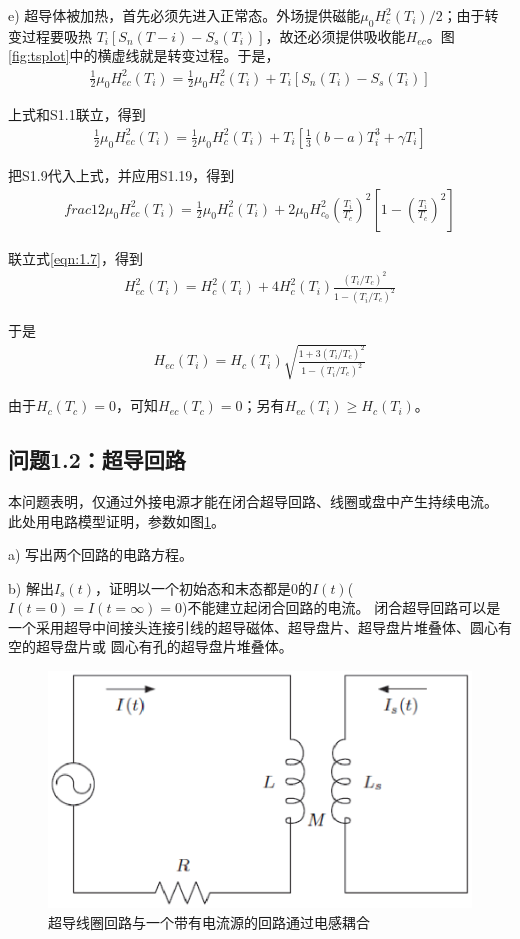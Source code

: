e) 超导体被加热，首先必须先进入正常态。外场提供磁能$\mu_0 H_c^2(T_i)/2$；由于转变过程要吸热
$T_i[S_n(T-i)-S_s(T_i)]$，故还必须提供吸收能$H_{ec}$。图\ref{fig:tsplot}中的横虚线就是转变过程。于是，
\begin{align*}
\frac{1}{2}\mu_0 H_{ec}^2(T_i)=\frac{1}{2}\mu_0 H_c^2(T_i)+T_i[S_n(T_i)-S_s(T_i)]\tag{S1.21}
\end{align*}

上式和S1.1联立，得到
\begin{align*}
\frac{1}{2}\mu_0 H_{ec}^2(T_i)=\frac{1}{2}\mu_0 H_c^2(T_i)+T_i\left[\frac{1}{3}(b-a)T_i^3+\gamma T_i\right] \tag{S1.22}
\end{align*}

把S1.9代入上式，并应用S1.19，得到
\begin{align*}
frac{1}{2}\mu_0 H_{ec}^2(T_i)=\frac{1}{2}\mu_0 H_c^2(T_i)+2\mu_0 H_{c_0}^2\left(\frac{T_i}{T_c}\right)^2 \left[1-\left(\frac{T_i}{T_c}\right)^2 \right] \tag{S1.23}
\end{align*}

联立式\ref{eqn:1.7}，得到
\begin{align*}
H_{ec}^2(T_i)=H_c^2(T_i)+4H_c^2(T_i)\frac{(T_i/T_c)^2}{1-(T_i/T_c)^2} \tag{S1.24}
\end{align*}

于是
\begin{align*}
H_{ec}(T_i)=H_c(T_i)\sqrt{\frac{1+3(T_i/T_c)^2}{1-(T_i/T_c)^2}}
\end{align*}

由于$H_c(T_c)=0$，可知$H_{ec}(T_c)=0$；另有$H_{ec}(T_i)\ge H_c(T_i)$。


\subsection{问题1.2：超导回路}
本问题表明，仅通过外接电源才能在闭合超导回路、线圈或盘中产生持续电流。
此处用电路模型证明，参数如图\ref{scloop}。
 
a) 写出两个回路的电路方程。

b) 解出$I_s(t)$，证明以一个初始态和末态都是0的$I(t)$($I(t=0)=I(t=\infty)=0$)不能建立起闭合回路的电流。
闭合超导回路可以是一个采用超导中间接头连接引线的超导磁体、超导盘片、超导盘片堆叠体、圆心有空的超导盘片或
圆心有孔的超导盘片堆叠体。

\begin{figure}[htbp]
  \centering
 \includegraphics[scale=0.6]{chpt1/figs/fig1.8.eps}
  \caption{
超导线圈回路与一个带有电流源的回路通过电感耦合
}\label{scloop}
\end{figure}

